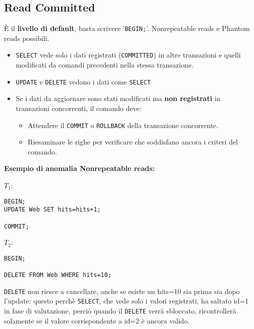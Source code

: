 \documentclass[a4paper, 10pt, titlepage]{article}
\begin{document}
		\subsection{Read Committed}
			È il \textbf{livello di default}, basta scrivere '\lstinline|BEGIN;|'. Nonrepeatable reads e Phantom reads possibili.
			\begin{itemize}
				\item \lstinline|SELECT| vede solo i dati registrati (\lstinline|COMMITTED|) in altre transazioni e quelli modificati da comandi precedenti nella stessa transazione.
				\item \lstinline|UPDATE| e \lstinline|DELETE| vedono i dati come \lstinline|SELECT|
				\item Se i dati da aggiornare sono stati modificati ma \textbf{non registrati} in transazioni concorrenti, il comando deve:
				\begin{itemize}
					\item Attendere il \lstinline|COMMIT| o \lstinline|ROLLBACK| della transazione concorrente.
					\item Riesaminare le righe per verificare che soddisfano ancora i criteri del comando.
				\end{itemize}
			\end{itemize}
			\textbf{Esempio di anomalia Nonrepeatable reads:}
			\begin{multicols}{2}
				\noindent
				$ T_1 $:
				\begin{lstlisting}
BEGIN;
UPDATE Web SET hits=hits+1;

COMMIT;
				\end{lstlisting}
				\columnbreak
				$ T_2 $:
				\begin{lstlisting}
BEGIN;

DELETE FROM Web WHERE hits=10;

				\end{lstlisting}
			\end{multicols}
			\lstinline|DELETE| non riesce a cancellare, anche se esiste un hits=10 sia prima sia dopo l'update: questo perchè \lstinline|SELECT|, che vede solo i valori registrati, ha saltato id=1 in fase di valutazione, perciò quando il \lstinline|DELETE| verrà sbloccato, ricontrollerà solamente se il valore corrispondente a id=2 è ancora valido.
			
\end{document}
